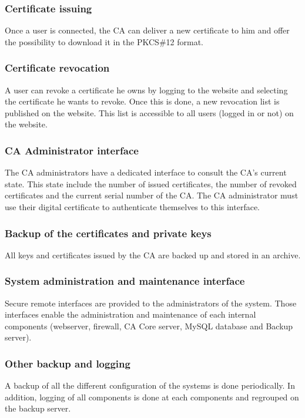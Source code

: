 \documentclass[english]{article}
\begin{document}
\subsubsection{Certificate issuing}
Once a user is connected, the CA can deliver a new certificate to him and offer the possibility to download it in the PKCS\#12 format.

\subsubsection{Certificate revocation}
A user can revoke a certificate he owns by logging to the website and selecting the certificate he wants to revoke. Once this is done, a new revocation list is published on the website. This list is accessible to all users (logged in or not) on the website.

\subsubsection{CA Administrator interface}
The CA administrators have a dedicated interface to consult the CA's current state. This state include the number of issued certificates, the number of revoked certificates and the current serial number of the CA. The CA administrator must use their digital certificate to authenticate themselves to this interface.

\subsubsection{Backup of the certificates and private keys}
All keys and certificates issued by the CA are backed up and stored in an archive.

\subsubsection{System administration and maintenance interface}
Secure remote interfaces are provided to the administrators of the system. Those interfaces enable the administration and maintenance of each internal components (webserver, firewall, CA Core server, MySQL database and Backup server).

\subsubsection{Other backup and logging}
A backup of all the different configuration of the systems is done periodically. In addition, logging of all components is done at each components and regrouped on the backup server.
\end{document}
